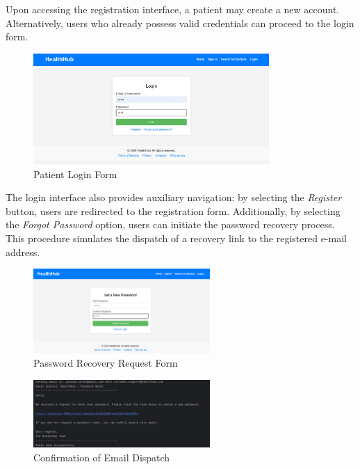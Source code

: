 Upon accessing the registration interface, a patient may create a new account. Alternatively, users who already possess valid credentials can proceed to the login form.

\begin{figure}[H]
	\centering
	\includegraphics[width=0.8\textwidth]{resources/screenshots/patient_ui/login-patient.png}
	\caption{Patient Login Form}
	\label{fig:login-patient}
\end{figure}

The login interface also provides auxiliary navigation: by selecting the \textit{Register} button, users are redirected to the registration form. Additionally, by selecting the \textit{Forgot Password} option, users can initiate the password recovery process. This procedure simulates the dispatch of a recovery link to the registered e-mail address.

\begin{figure}[H]
	\centering
	\includegraphics[width=0.6\textwidth]{resources/screenshots/patient_ui/recover1.png}
	\caption{Password Recovery Request Form}
	\label{fig:recover1}
\end{figure}

\begin{figure}[H]
	\centering
	\includegraphics[width=0.6\textwidth]{resources/screenshots/patient_ui/recover2.png}
	\caption{Confirmation of Email Dispatch}
	\label{fig:recover2}
\end{figure}

